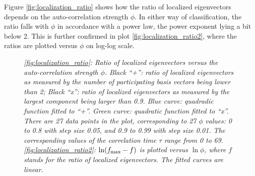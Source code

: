 \documentclass{report}
\begin{document}
Figure \ref{fig:localization_ratio} shows how the ratio of localized
eigenvectors depends on the auto-correlation strength $\phi$. In
either way of classification, the ratio falls with $\phi$ in
accordance with a power law, the power exponent lying a bit below 2.
This is further confirmed in plot \ref{fig:localization_ratio2}, where
the ratios are plotted versus $\phi$ on log-log scale.
\begin{figure}[htb!]
  \centering
  \caption{\small \it \ref{fig:localization_ratio}: Ratio of localized
    eigenvectors versus the auto-correlation strength $\phi$. Black
    ``+'': ratio of localized eigenvectors as measured by the number
    of participating basis vectors being lower than 2; Black ``x'':
    ratio of localized eigenvectors as measured by the largest
    component being larger than 0.9. Blue curve: quadradic function
    fitted to ``+''. Green curve: quadratic function fitted to
    ``x''. There are 27 data points in the plot, corresponding to 27
    $\phi$ values: 0 to 0.8 with step size 0.05, and 0.9 to 0.99 with
    step size 0.01. The corresponding values of the correlation time
    $\tau$ range from 0 to 69. \ref{fig:localization_ratio2}: $\ln
    (f_{\text{max}} - f)$ is plotted versus $\ln \phi$, where $f$ stands for the
    ratio of localized eigenvectors. The fitted curves are linear.}
\end{figure}

\end{document}
